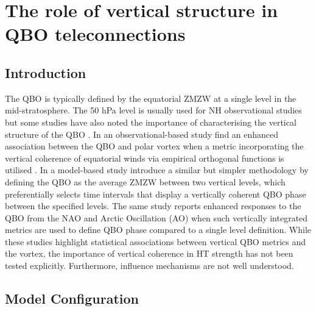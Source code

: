 \chapter{The role of vertical structure in QBO teleconnections}
\label{cha:deepQBO}

\section{Introduction}
\label{sec:deepQBO-introduction}
The QBO is typically defined by the equatorial ZMZW at a single level in the mid-stratosphere. The 50 hPa level is usually used for NH observational studies \citep{Baldwin2001, Baldwin98} but some studies have also noted the importance of characterising the vertical structure of the QBO \citep{Fraedrih1993, Wallace1993,  Baldwin98,  Dunkerton2017, Gray2018, andrewsObserved2019}. In an observational-based study \cite{Gray2018} find an enhanced association between the QBO and polar vortex when a metric incorporating the vertical coherence of equatorial winds via empirical orthogonal functions is utilised \citep{verena2016a}. In a model-based study \cite{Andrews2019} introduce a similar but simpler methodology by defining the QBO as the average ZMZW between two vertical levels, which preferentially selects time intervals that display a vertically coherent QBO phase between the specified levels. The same study reports enhanced responses to the QBO from the NAO and Arctic Oscillation (AO) when such vertically integrated metrics are used to define QBO phase compared to a single level definition. While these studies highlight statistical associations between vertical QBO metrics and the vortex, the importance of vertical coherence in HT strength has not been tested explicitly. Furthermore, influence mechanisms are not well understood. 


\section{Model Configuration}

